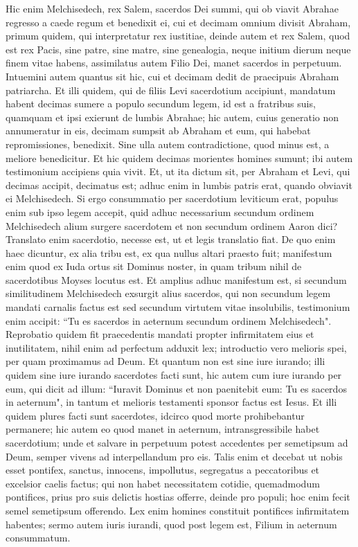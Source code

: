 \begin{biblechapter} 
\verse Hic enim Melchisedech, rex Salem, sacerdos Dei summi, qui ob viavit Abrahae regresso a caede regum et benedixit ei, 
\verse cui et decimam omnium divisit Abraham, primum quidem, qui interpretatur rex iustitiae, deinde autem et rex Salem, quod est rex Pacis, 
\verse sine patre, sine matre, sine genealogia, neque initium dierum neque finem vitae habens, assimilatus autem Filio Dei, manet sacerdos in perpetuum. 
\verse Intuemini autem quantus sit hic, cui et decimam dedit de praecipuis Abraham patriarcha. 
\verse Et illi quidem, qui de filiis Levi sacerdotium accipiunt, mandatum habent decimas sumere a populo secundum legem, id est a fratribus suis, quamquam et ipsi exierunt de lumbis Abrahae; 
\verse hic autem, cuius generatio non annumeratur in eis, decimam sumpsit ab Abraham et eum, qui habebat repromissiones, benedixit. 
\verse Sine ulla autem contradictione, quod minus est, a meliore benedicitur. 
\verse Et hic quidem decimas morientes homines sumunt; ibi autem testimonium accipiens quia vivit. 
\verse Et, ut ita dictum sit, per Abraham et Levi, qui decimas accipit, decimatus est; 
\verse adhuc enim in lumbis patris erat, quando obviavit ei Melchisedech. 
\verse Si ergo consummatio per sacerdotium leviticum erat, populus enim sub ipso legem accepit, quid adhuc necessarium secundum ordinem Melchisedech alium surgere sacerdotem et non secundum ordinem Aaron dici? 
\verse Translato enim sacerdotio, necesse est, ut et legis translatio fiat. 
\verse De quo enim haec dicuntur, ex alia tribu est, ex qua nullus altari praesto fuit; 
\verse manifestum enim quod ex Iuda ortus sit Dominus noster, in quam tribum nihil de sacerdotibus Moyses locutus est. 
\verse Et amplius adhuc manifestum est, si secundum similitudinem Melchisedech exsurgit alius sacerdos, 
\verse qui non secundum legem mandati carnalis factus est sed secundum virtutem vitae insolubilis, 
\verse testimonium enim accipit: “Tu es sacerdos in aeternum secundum ordinem Melchisedech". 
\verse Reprobatio quidem fit praecedentis mandati propter infirmitatem eius et inutilitatem, 
\verse nihil enim ad perfectum adduxit lex; introductio vero melioris spei, per quam proximamus ad Deum. 
\verse Et quantum non est sine iure iurando; illi quidem sine iure iurando sacerdotes facti sunt, 
\verse hic autem cum iure iurando per eum, qui dicit ad illum: “Iuravit Dominus et non paenitebit eum: Tu es sacerdos in aeternum", 
\verse in tantum et melioris testamenti sponsor factus est Iesus. 
\verse Et illi quidem plures facti sunt sacerdotes, idcirco quod morte prohibebantur permanere; 
\verse hic autem eo quod manet in aeternum, intransgressibile habet sacerdotium; 
\verse unde et salvare in perpetuum potest accedentes per semetipsum ad Deum, semper vivens ad interpellandum pro eis. 
\verse Talis enim et decebat ut nobis esset pontifex, sanctus, innocens, impollutus, segregatus a peccatoribus et excelsior caelis factus; 
\verse qui non habet necessitatem cotidie, quemadmodum pontifices, prius pro suis delictis hostias offerre, deinde pro populi; hoc enim fecit semel semetipsum offerendo. 
\verse Lex enim homines constituit pontifices infirmitatem habentes; sermo autem iuris iurandi, quod post legem est, Filium in aeternum consummatum. 
\end{biblechapter}


